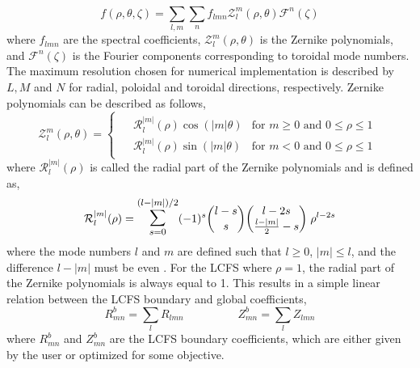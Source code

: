 \documentclass{jpp}
\begin{document}
\begin{equation}
    f(\rho,\theta,\zeta) = \sum_{l,m}^{}\sum_{n}^{} f_{lmn} \mathcal{Z}_l^{m} (\rho, \theta) \mathcal{F}^n(\zeta) \label{fourier-zernike-coef}
\end{equation}
where $f_{lmn}$ are the spectral coefficients, $\mathcal{Z}_l^{m}(\rho, \theta)$ is the Zernike polynomials, and $\mathcal{F}^n(\zeta)$ is the Fourier components corresponding to toroidal mode numbers. The maximum resolution chosen for numerical implementation is described by $L, M$ and $N$ for radial, poloidal and toroidal directions, respectively. Zernike polynomials can be described as follows,
\begin{equation}
    \mathcal{Z}_l^{m}(\rho,\theta) = \begin{cases}\begin{aligned}
            &\mathcal{R}_l^{|m|}(\rho) \cos(|m|\theta) & \text{for } m\geq 0 \text{ and } 0\leq\rho\leq 1 \\[.3cm]
            &\mathcal{R}_l^{|m|}(\rho) \sin(|m|\theta) & \text{for } m < 0  \text{ and } 0\leq\rho\leq 1
        \end{aligned}
    \end{cases}
\end{equation}
where $\mathcal{R}_l^{|m|}(\rho)$ is called the radial part of the Zernike polynomials and is defined as,
\begin{equation}
    \mathcal{R}_l^{|m|} (\rho) = \mathlarger{\mathlarger{\sum}}_{s=0}^{(l-|m|)/2} (-1)^s \binom{l-s}{s} \binom{l-2s}{\frac{l-|m|}{2}-s}\hspace{0.1cm} \rho^{l-2s} \label{radial-part-eq-binom}
\end{equation}
where the mode numbers $l$ and $m$ are defined such that $l\geq0$, $|m|\leq l$, and the difference $l-|m|$ must be even \citep{zernikeBeugungstheorieSchneidenverfahrensUnd1934, zernikeDiffractionTheoryKnifeEdge1934}. For the LCFS where $\rho=1$, the radial part of the Zernike polynomials is always equal to 1. This results in a simple linear relation between the LCFS boundary and global coefficients,
\begin{equation}
    R^b_{mn} = \sum_l R_{lmn} \hspace{2cm} Z^b_{mn} = \sum_l Z_{lmn} \label{lcfs_rel}
\end{equation}
where $R^b_{mn}$ and $Z^b_{mn}$ are the LCFS boundary coefficients, which are either given by the user or optimized for some objective.
\end{document}
